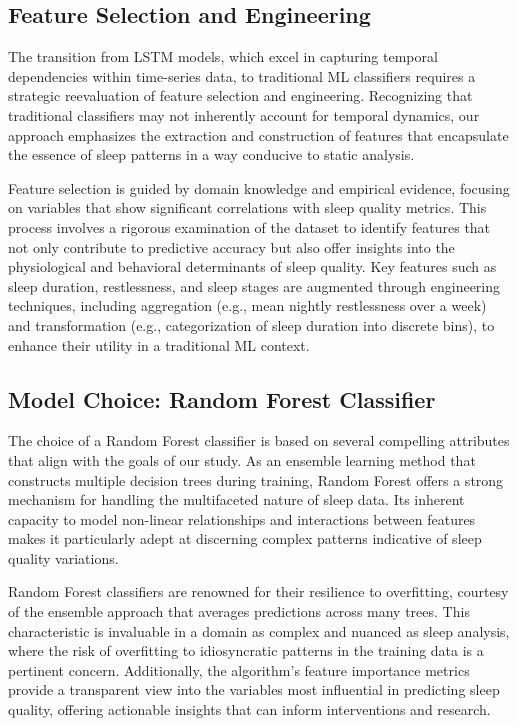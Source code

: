 \documentclass[10pt]{extarticle}
\begin{document}
\subsection{Feature Selection and Engineering}

The transition from LSTM models, which excel in capturing temporal dependencies within time-series data, to traditional ML classifiers requires a strategic reevaluation of feature selection and engineering. Recognizing that traditional classifiers may not inherently account for temporal dynamics, our approach emphasizes the extraction and construction of features that encapsulate the essence of sleep patterns in a way conducive to static analysis.

Feature selection is guided by domain knowledge and empirical evidence, focusing on variables that show significant correlations with sleep quality metrics. This process involves a rigorous examination of the dataset to identify features that not only contribute to predictive accuracy but also offer insights into the physiological and behavioral determinants of sleep quality. Key features such as sleep duration, restlessness, and sleep stages are augmented through engineering techniques, including aggregation (e.g., mean nightly restlessness over a week) and transformation (e.g., categorization of sleep duration into discrete bins), to enhance their utility in a traditional ML context.

\subsection{Model Choice: Random Forest Classifier}

The choice of a Random Forest classifier is based on several compelling attributes that align with the goals of our study. As an ensemble learning method that constructs multiple decision trees during training, Random Forest offers a strong mechanism for handling the multifaceted nature of sleep data. Its inherent capacity to model non-linear relationships and interactions between features makes it particularly adept at discerning complex patterns indicative of sleep quality variations.

Random Forest classifiers are renowned for their resilience to overfitting, courtesy of the ensemble approach that averages predictions across many trees. This characteristic is invaluable in a domain as complex and nuanced as sleep analysis, where the risk of overfitting to idiosyncratic patterns in the training data is a pertinent concern. Additionally, the algorithm's feature importance metrics provide a transparent view into the variables most influential in predicting sleep quality, offering actionable insights that can inform interventions and research.
\end{document}
